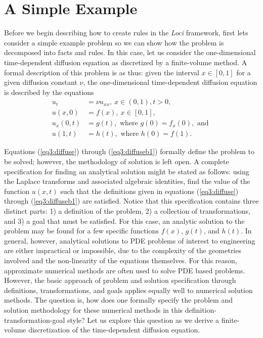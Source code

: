 \documentclass[10pt,epsf,letterpaper,twoside]{book}
\begin{document}


\chapter{A Simple Example}

Before we begin describing how to create rules in the {\it Loci} framework,
first lets consider a simple example problem so we can show how the
problem is decomposed into facts and rules.  In this case, let us
consider the one-dimensional time-dependent diffusion equation as
discretized by a finite-volume method. A formal description of this
problem is as thus: given the interval $x\in[0,1]$ for a given
diffusion constant $\nu$, the one-dimensional time-dependent diffusion
equation is described by the equations
\begin{align}
\label{eq3:diffuse}
u_t      & =  \nu u_{xx},~ x \in (0,1), t>0,\\
\label{eq3:diffuseinitial}
u(x,0)   & =  f(x),~ x \in [0,1],\\
\label{eq3:diffuseb0}
u_x(0,t) & =  g(t), \mbox{ where } g(0) = f_x(0), \mbox{ and }\\
\label{eq3:diffuseb1}
u(1,t) & =  h(t), \mbox{ where } h(0) = f(1).
\end{align}

Equations (\ref{eq3:diffuse}) through (\ref{eq3:diffuseb1}) formally
define the problem to be solved; however, the methodology of solution
is left open.  A complete specification for finding an analytical
solution might be stated as follows: using the Laplace transforms and
associated algebraic identities, find the value of the function
$u(x,t)$ such that the definitions given in equations
(\ref{eq3:diffuse}) through (\ref{eq3:diffuseb1}) are satisfied.
Notice that this specification contains three distinct parts: 1) a
definition of the problem, 2) a collection of transformations, and 3)
a goal that must be satisfied.  For this case, an analytic solution to
the problem may be found for a few specific functions $f(x)$, $g(t)$,
and $h(t)$.  In general, however, analytical solutions to PDE problems
of interest to engineering are either impractical or impossible, due
to the complexity of the geometries involved and the non-linearity of
the equations themselves.  For this reason, approximate numerical
methods are often used to solve PDE based problems.  However, the
basic approach of problem and solution specification through
definitions, transformations, and goals applies equally well to
numerical solution methods.  The question is, how does one formally
specify the problem and solution methodology for these numerical
methods in this definition-transformation-goal style?  Let us explore
this question as we derive a finite-volume discretization of the
time-dependent diffusion equation.
\end{document}
